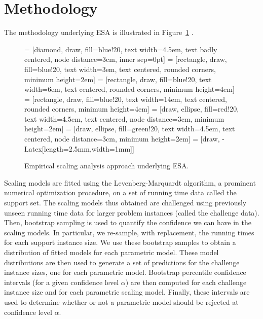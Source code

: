 \documentclass[aic]{iosart2x}
\begin{document}


\section{Methodology}
\label{sec:method}

The methodology underlying ESA is illustrated in Figure~\ref{fig:methodology} \cite{Hoo09}.
\begin{figure}[t]
\noindent \centering{} = [diamond, draw, fill=blue!20, text width=4.5em, text badly centered, node distance=3cm, inner sep=0pt]
 = [rectangle, draw, fill=blue!20, text width=3em, text centered, rounded corners, minimum height=2em]
 = [rectangle, draw, fill=blue!20, text width=6em, text centered, rounded corners, minimum height=4em]
 = [rectangle, draw, fill=blue!20, text width=14em, text centered, rounded corners, minimum height=4em]
 = [draw, ellipse, fill=red!20, text width=4.5em, text centered, node distance=3cm, minimum height=2em]
 = [draw, ellipse, fill=green!20, text width=4.5em, text centered, node distance=3cm, minimum height=2em]
 = [draw, -{Latex[length=2.5mm,width=1mm]}]

\caption{Empirical scaling analysis approach underlying ESA.}\label{fig:methodology}
\end{figure}
Scaling models are fitted using the Levenberg-Marquardt algorithm, a prominent numerical optimization procedure,
on a set of running time data called the support set. The scaling models thus obtained are challenged using previously unseen running time data for larger problem instances (called the challenge data). Then, bootstrap sampling is used to quantify the confidence we can have in the scaling models. In particular, we re-sample, with replacement, the running times for each support instance size. We use these bootstrap samples to obtain a distribution of fitted models for each parametric model. These model distributions are then used to generate a set of predictions for the challenge instance sizes, one for each parametric model. Bootstrap percentile confidence intervals (for a given confidence level $\alpha$) are then computed for each challenge instance size and for each parametric scaling model. Finally, these intervals are used to determine whether or not a parametric model should be rejected at confidence level $\alpha$.
\end{document}
